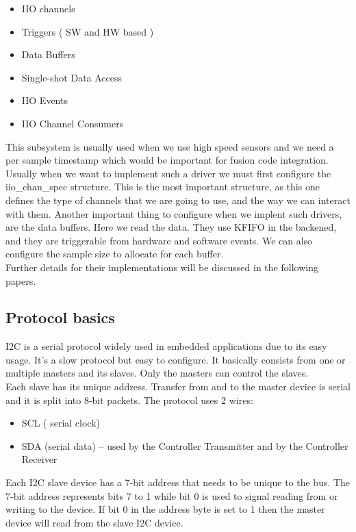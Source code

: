 \documentclass[l2pt, letterpaper]{article}
\begin{document}
\begin{itemize}
    \item IIO channels
    \item Triggers ( SW and HW based )
    \item Data Buffers
    \item Single-shot Data Access
    \item IIO Events
    \item IIO Channel Consumers
\end{itemize}


This subsystem is usually used when we use high speed sensors and we need a
per sample timestamp which would be important for fusion code integration.\\
Usually when we want to implement such a driver we must first configure the
iio_chan_spec structure. This is the most important structure, as this one defines
the type of channels that we are going to use, and the way we can interact with
them. Another important thing to configure when we implent such drivers, are
the data buffers. Here we read the data. They use KFIFO in the backened, and
they are triggerable from hardware and software events. We can also configure
the sample size to allocate for each buffer.\\
Further details for their implementations will be discussed in the following
papers.

\subsection{Protocol basics}

I2C is a serial protocol widely used in embedded applications due to its easy
usage. It’s a slow protocol but easy to configure. It basically consists from one or
multiple masters and its slaves. Only the masters can control the slaves.\\
Each slave has its unique address. Transfer from and to the master device is
serial and it is split into 8-bit packets. The protocol uses 2 wires:\\
\begin{itemize}
    \item SCL ( serial clock)
    \item SDA (serial data) – used by the Controller Transmitter and by the
Controller Receiver
\end{itemize}

Each I2C slave device has a 7-bit address that needs to be unique to the bus.
The 7-bit address represents bits 7 to 1 while bit 0 is used to signal reading from
or writing to the device. If bit 0 in the address byte is set to 1 then the master
device will read from the slave I2C device.\\
\end{document}
